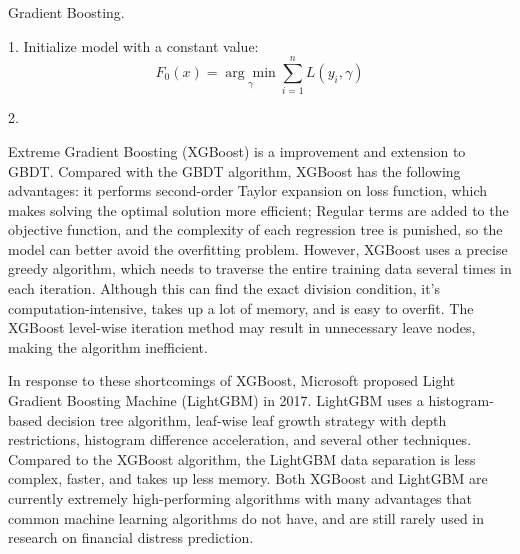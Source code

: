 \documentclass[review]{elsarticle}
\begin{document}
\begin{algorithm}[H]
    \SetAlgoLined
    \caption{Gradient Boosting.} %

    1. Initialize model with a constant value:
    $$
    F_{0}(x)=\underset{\gamma}{\arg \min } \sum_{i=1}^{n} L\left(y_{i}, \gamma\right)
    $$

    2. 
    \label{alg:gbdt}
\end{algorithm}


Extreme Gradient Boosting (XGBoost) \citep{Chen2016} is a improvement and extension to GBDT. Compared with the GBDT algorithm, XGBoost has the following advantages: it performs second-order Taylor expansion on loss function, which makes solving the optimal solution more efficient; Regular terms are added to the objective function, and the complexity of each regression tree is punished, so the model can better avoid the overfitting problem. However, XGBoost uses a precise greedy algorithm, which needs to traverse the entire training data several times in each iteration. Although this can find the exact division condition, it's computation-intensive, takes up a lot of memory, and is easy to overfit. The XGBoost level-wise iteration method may result in unnecessary leave nodes, making the algorithm inefficient.

In response to these shortcomings of XGBoost, Microsoft proposed Light Gradient Boosting Machine (LightGBM) \citep{Ke2017} in 2017. LightGBM uses a histogram-based decision tree algorithm, leaf-wise leaf growth strategy with depth restrictions, histogram difference acceleration, and several other techniques. Compared to the XGBoost algorithm, the LightGBM data separation is less complex, faster, and takes up less memory. Both XGBoost and LightGBM are currently extremely high-performing algorithms with many advantages that common machine learning algorithms do not have, and are still rarely used in research on financial distress prediction.
\end{document}
